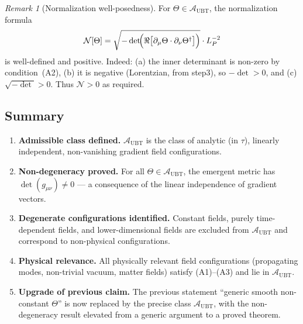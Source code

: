 \documentclass[12pt]{article}
\theoremstyle{definition}
\theoremstyle{remark}
\newtheorem{remark}[theorem]{Remark}
\begin{document}
\begin{remark}[Normalization well-posedness]
For $\Theta\in\mathcal{A}_{\mathrm{UBT}}$, the normalization formula
\[
  \mathcal{N}[\Theta] = \sqrt{-\det\!\Bigl(\Re\bigl[\partial_\mu\Theta\cdot\partial_\nu\Theta^\dagger\bigr]\Bigr)}\cdot L_P^{-2}
\]
is well-defined and positive.  Indeed: (a) the inner determinant is non-zero
by condition~(A2), (b) it is negative (Lorentzian, from step3), so
$-\det > 0$, and (c) $\sqrt{-\det} > 0$.
Thus $\mathcal{N} > 0$ as required.
\end{remark}

\subsection{Summary}

\begin{enumerate}
  \item \textbf{Admissible class defined.}
        $\mathcal{A}_{\mathrm{UBT}}$ is the class of analytic (in $\tau$), linearly
        independent, non-vanishing gradient field configurations.

  \item \textbf{Non-degeneracy proved.}
        For all $\Theta\in\mathcal{A}_{\mathrm{UBT}}$, the emergent metric has
        $\det(g_{\mu\nu})\neq 0$ — a consequence of the linear independence of gradient
        vectors.

  \item \textbf{Degenerate configurations identified.}
        Constant fields, purely time-dependent fields, and lower-dimensional fields
        are excluded from $\mathcal{A}_{\mathrm{UBT}}$ and correspond to non-physical
        configurations.

  \item \textbf{Physical relevance.}
        All physically relevant field configurations (propagating modes, non-trivial
        vacuum, matter fields) satisfy (A1)--(A3) and lie in $\mathcal{A}_{\mathrm{UBT}}$.

  \item \textbf{Upgrade of previous claim.}
        The previous statement ``generic smooth non-constant $\Theta$'' is now replaced
        by the precise class $\mathcal{A}_{\mathrm{UBT}}$, with the non-degeneracy
        result elevated from a generic argument to a proved theorem.
\end{enumerate}

\ifdefined\INCLUDEMODE
\else
  
\end{document}
